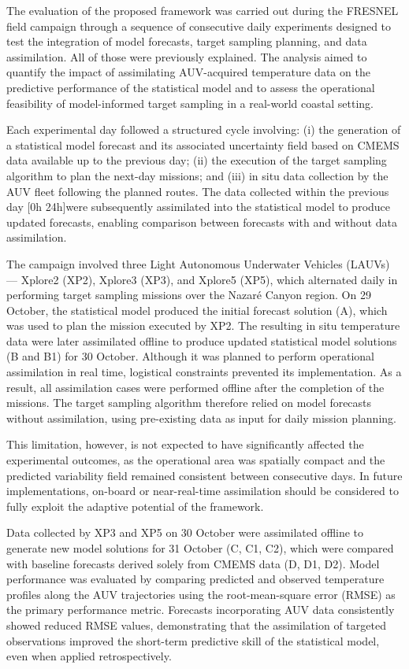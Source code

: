 The evaluation of the proposed framework was carried out during the FRESNEL field campaign through a sequence of consecutive daily experiments designed to test the integration of model forecasts, target sampling planning, and data assimilation. All of those were previously explained. The analysis aimed to quantify the impact of assimilating AUV-acquired temperature data on the predictive performance of the statistical model and to assess the operational feasibility of model-informed target sampling in a real-world coastal setting.

Each experimental day followed a structured cycle involving: (i) the generation of a statistical model forecast and its associated uncertainty field based on CMEMS data available up to the previous day; (ii) the execution of the target sampling algorithm to plan the next-day missions; and (iii) in situ data collection by the AUV fleet following the planned routes. The data collected within the previous day [0h 24h]were subsequently assimilated into the statistical model to produce updated forecasts, enabling comparison between forecasts with and without data assimilation.

The campaign involved three Light Autonomous Underwater Vehicles (LAUVs) — Xplore2 (XP2), Xplore3 (XP3), and Xplore5 (XP5), which alternated daily in performing target sampling missions over the Nazaré Canyon region. On 29 October, the statistical model produced the initial forecast solution (A), which was used to plan the mission executed by XP2. The resulting in situ temperature data were later assimilated offline to produce updated statistical model solutions (B and B1) for 30 October. Although it was planned to perform operational assimilation in real time, logistical constraints prevented its implementation. As a result, all assimilation cases were performed offline after the completion of the missions. The target sampling algorithm therefore relied on model forecasts without assimilation, using pre-existing data as input for daily mission planning.

This limitation, however, is not expected to have significantly affected the experimental outcomes, as the operational area was spatially compact and the predicted variability field remained consistent between consecutive days. In future implementations, on-board or near-real-time assimilation should be considered to fully exploit the adaptive potential of the framework.

Data collected by XP3 and XP5 on 30 October were assimilated offline to generate new model solutions for 31 October (C, C1, C2), which were compared with baseline forecasts derived solely from CMEMS data (D, D1, D2). Model performance was evaluated by comparing predicted and observed temperature profiles along the AUV trajectories using the root-mean-square error (RMSE) as the primary performance metric. Forecasts incorporating AUV data consistently showed reduced RMSE values, demonstrating that the assimilation of targeted observations improved the short-term predictive skill of the statistical model, even when applied retrospectively.


